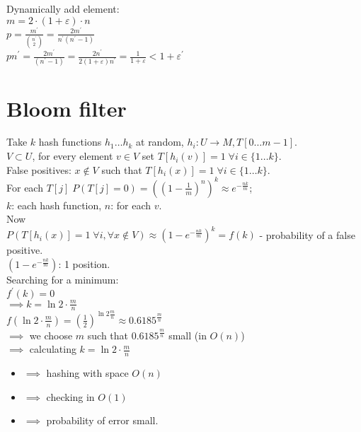 \documentclass[a4paper, 12pt]{book}
\theoremstyle{definition}
\theoremstyle{remark}
\begin{document}
Dynamically add element: \\
$m = 2 \cdot (1 + \varepsilon) \cdot n$ \\
$p = \frac{m^{'}}{\binom{n^{'}}{2}} = \frac{2 m^{'}}{n^{'} (n^{'}-1)}$ \\
$pn^{'} = \frac{2m^{'}}{(n^{'}-1)} = \frac{2n^{'}}{2 (1+\varepsilon) n^{'}} = \frac{1}{1+\varepsilon} < 1 + \varepsilon^{'}$



\section{Bloom filter}

Take $k$ hash functions $h_1 \dots h_k$ at random, $h_i: U \to M, T[0 \dots m-1]$. \\
$V \subset U$, for every element $v \in V$ set $T[h_i(v)] = 1 \; \forall i \in \{1 \dots k\}$. \\
False positives: $x \notin V$ such that $T[h_i(x)] = 1 \; \forall i \in \{1 \dots k\}$. \\
For each $T[j] \; P(T[j] = 0) = \left(\left(1 - \frac{1}{m}\right)^n\right)^k \approx e^{-\frac{nk}{m}}$; \\
$k$: each hash function, $n$: for each $v$. \\
Now \\
$P\left(T[h_i(x)] = 1 \; \forall i, \forall x \notin V\right) \approx \left(1 - e^{-\frac{nk}{m}}\right)^k = f(k)$
- probability of a false positive. \\
$\left(1 - e^{-\frac{nk}{m}}\right)$: 1 position. \\
Searching for a minimum: \\
$f^{'}(k) = 0$ \\
$\implies k = \ln 2 \cdot \frac{m}{n}$ \\
$f\left(\ln 2 \cdot \frac{m}{n}\right) = \left(\frac{1}{2}\right)^{\ln 2 \frac{m}{n}} \approx 0.6185^{\frac{m}{n}}$ \\
$\implies$ we choose $m$ such that $0.6185^{\frac{m}{n}}$ small (in $O(n)$) \\
$\implies$ calculating $k = \ln 2 \cdot \frac{m}{n}$
\begin{itemize}[label={}]
  \item $\implies$ hashing with space $O(n)$
  \item $\implies$ checking in $O(1)$
  \item $\implies$ probability of error small.
\end{itemize}
\end{document}
